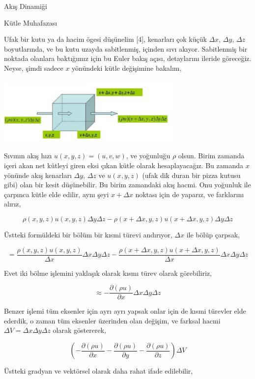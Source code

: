 \documentclass[12pt,fleqn]{article}\usepackage{../../common}
\begin{document}
Akış Dinamiği

Kütle Muhafazası

Ufak bir kutu ya da hacim ögesi düşünelim [4], kenarları çok küçük $\Delta x$,
$\Delta y$, $\Delta z$ boyutlarında, ve bu kutu uzayda sabitlenmiş, içinden sıvı
akıyor. Sabitlenmiş bir noktada olanlara baktığımız için bu Euler bakış açısı,
detaylarını ileride göreceğiz. Neyse, şimdi sadece $x$ yönündeki kütle
değişimine bakalım,

\includegraphics[width=25em]{phy_050_fluid_02.jpg}

Sıvının akış hızı $u(x,y,z) = (u,v,w)$, ve yoğunluğu $\rho$ olsun. Birim zamanda
içeri akan net kütleyi giren eksi çıkan kütle olarak hesaplayacağız. Bu zamanda
$x$ yönünde akış kenarları $\Delta y$, $\Delta z$ ve $u(x,y,z)$ (ufak dik duran
bir pizza kutusu gibi) olan bir kesit düşünebilir. Bu birim zamandaki akış
hacmi.  Onu yoğunluk ile çarpınca kütle elde edilir, aynı şeyi $x + \Delta x$
noktası için de yaparız, ve farklarını alırız,

$$
\rho(x,y,z)u(x,y,z)\Delta y \Delta z -
\rho(x+\Delta x,y,z) u(x+\Delta x,y,z)\Delta y \Delta z
$$

Üstteki formüldeki bir bölüm bir kısmi türevi andırıyor, $\Delta x$ ile bölüp
çarpsak,

$$
= \frac{\rho(x,y,z)u(x,y,z)}{\Delta x}\Delta x \Delta y \Delta z -
\frac{\rho(x+\Delta x,y,z) u(x+\Delta x,y,z)}{\Delta x} \Delta x \Delta y \Delta z
$$

Evet iki bölme işlemini yaklaşık olarak kısmı türev olarak görebiliriz,

$$
\approx -\frac{\partial (\rho u) }{\partial x} \Delta x \Delta y \Delta z
$$

Benzer işlemi tüm eksenler için ayrı ayrı yapsak onlar için de kısmi türevler
elde ederdik, o zaman tüm eksenler üzerinden olan değişim, ve farksal hacmi
$\Delta V = \Delta x \Delta y \Delta z$ olarak göstererek,

$$
\left(
-\frac{\partial (\rho u) }{\partial x} 
-\frac{\partial (\rho u) }{\partial y} 
-\frac{\partial (\rho u) }{\partial z} 
\right) \Delta V
$$

Üstteki gradyan ve vektörsel olarak daha rahat ifade edilebilir,
\end{document}
